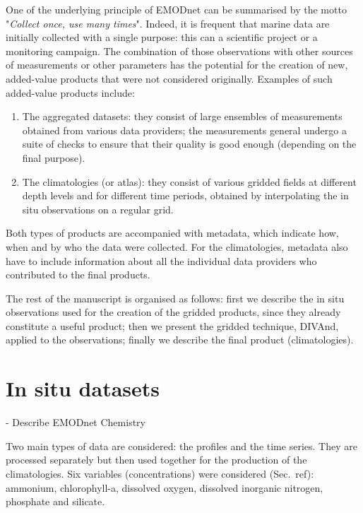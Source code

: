 \documentclass[essd, manuscript]{copernicus}
\begin{document}
One of the underlying principle of EMODnet can be summarised by the motto "\textit{Collect once, use many times}". Indeed, it is frequent that marine data are initially collected with a single purpose: this can a scientific project or a monitoring campaign. The combination of those observations with other sources of measurements or other parameters has the potential for the creation of new, added-value products that were not considered originally. Examples of such added-value products include:
\begin{enumerate}
\item The aggregated datasets: they consist of large ensembles of measurements obtained from various data providers; the measurements general undergo a suite of checks to ensure that their quality is good enough (depending on the final purpose).
\item The climatologies (or atlas): they consist of various gridded fields at different depth levels and for different time periods, obtained by interpolating the in situ observations on a regular grid.
\end{enumerate}

Both types of products are accompanied with metadata, which indicate how, when and by who the data were collected. For the climatologies, metadata also have to include information about all the individual data providers who contributed to the final products. 

The rest of the manuscript is organised as follows: first we describe the in situ observations used for the creation of the gridded products, since they already constitute a useful product; then we present the gridded technique, DIVAnd, applied to the observations; finally we describe the final product (climatologies). 


\section{In situ datasets\label{sec:insitu}}


- Describe EMODnet Chemistry \citep{Giorgetti2018}

Two main types of data are considered: the profiles and the time series. They are processed separately but then used together for the production of the climatologies. Six variables (concentrations) were considered (Sec.~ref{}): ammonium, chlorophyll-a, dissolved oxygen, dissolved inorganic nitrogen, phosphate and silicate.
\end{document}
